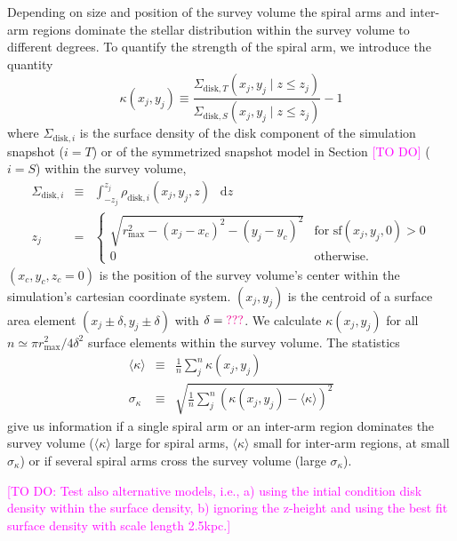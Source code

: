 \documentclass[iop,revtex4,numberedappendix,appendixfloats]{emulateapj}
\newcommand*\diff{\mathop{}\!\mathrm{d}}
\newcommand{\Wilma}[1]{\textcolor{Magenta}{#1}}
\begin{document}
Depending on size and position of the survey volume the spiral arms and inter-arm regions dominate the stellar distribution within the survey volume to different degrees. To quantify the strength of the spiral arm, we introduce the quantity
\begin{equation*}
\kappa(x_j,y_j) \equiv \frac{\Sigma_{\text{disk},T}(x_j,y_j \mid z\leq z_j)}{\Sigma_{\text{disk},S}(x_j,y_j \mid z\leq z_j)} -1
\end{equation*}
where $\Sigma_{\text{disk},i}$ is the surface density of the disk component  of the simulation snapshot ($i=T$) or of the symmetrized snapshot model in Section \Wilma{[TO DO]} ($i=S$) within the survey volume,
\begin{eqnarray*}
\Sigma_{\text{disk},i} &\equiv& \int_{-z_j}^{z_j} \rho_{\text{disk},i}(x_j,y_j,z) \ \diff z\\
z_j &=& \begin{cases}
\sqrt{r_\text{max}^2 - (x_j-x_c)^2 - (y_j-y_c)^2} & \text{for sf}(x_j,y_j,0) > 0\\
0 & \text{otherwise.}
\end{cases}
\end{eqnarray*}
$(x_c,y_c,z_c=0)$ is the position of the survey volume's center within the simulation's cartesian coordinate system. $(x_j,y_j)$ is the centroid of a surface area element $(x_j\pm\delta,y_j\pm \delta)$ with $\delta=\Wilma{???}$. We calculate $\kappa(x_j,y_j)$ for all $n \simeq \pi r_\text{max}^2/4\delta^2$ surface elements within the survey volume. The statistics
\begin{eqnarray*}
\langle \kappa \rangle &\equiv& \frac 1n \sum_j^n \kappa(x_j,y_j)\\
\sigma_\kappa &\equiv& \sqrt{\frac 1n \sum_j^n \left(\kappa(x_j,y_j) - \langle \kappa \rangle \right)^2}
\end{eqnarray*}
give us information if a single spiral arm or an inter-arm region dominates the survey volume ($\langle \kappa \rangle$ large for spiral arms, $\langle \kappa \rangle$ small for inter-arm regions, at small $\sigma_\kappa$) or if several spiral arms cross the survey volume (large $\sigma_\kappa$).

\Wilma{[TO DO: Test also alternative models, i.e., a) using the intial condition disk density within the surface density, b) ignoring the z-height and using the best fit surface density with scale length 2.5kpc.]}

\end{document}
